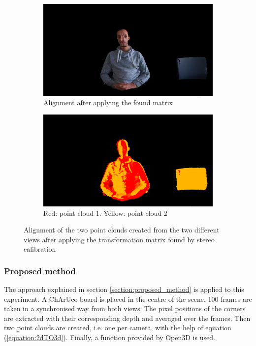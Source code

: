 \begin{figure}[H]
\centering
  \begin{subfigure}[b]{0.48 \textwidth}
    \includegraphics[width=\textwidth]{images/registration/stereo_RGB.png}
    \caption{Alignment after applying the found matrix}
    \label{figure:stereo_RGB}
  \end{subfigure}
  \hfill
  \begin{subfigure}[b]{0.48\textwidth}
    \includegraphics[width=\textwidth]{images/registration/stereo_colored.png}
    \caption{Red: point cloud 1. Yellow: point cloud 2}
    \label{figure:stereo_colored}
  \end{subfigure}
  \caption{Alignment of the two point clouds created from the two different views after applying the transformation matrix found by stereo calibration}
  \label{figure:stereo_misaligned}
\end{figure}

\subsubsection{Proposed method}

The approach explained in section \ref{section:proposed_method} is applied to this experiment. A ChArUco board is placed in the centre of the scene. 100 frames are taken in a synchronised way from both views. The pixel positions of the corners are extracted with their corresponding depth and averaged over the frames. Then two point clouds are created, i.e. one per camera, with the help of equation (\ref{equation:2dTO3d}). Finally, a function provided by Open3D \cite{Zhou2018} is used.

